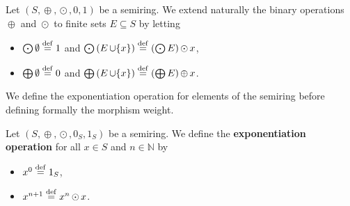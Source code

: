 \begin{notation} 
    \label{def:bigodot}
Let $(S, \mathop{\oplus}, \mathop{\odot}, 0, 1)$ be a semiring. We extend naturally the binary operations $\mathop{\oplus}$ and $\mathop{\odot}$ to finite sets $E \mathop{\subseteq} S$ by letting
    \begin{itemize}
        \item $\mathop{\bigodot} \emptyset \overset{\operatorname{def}}{=} 1$ and $\mathop{\bigodot} \left( E \mathop{\cup} \{x\} \right) \overset{\operatorname{def}}{=} \left( \mathop{\bigodot} E \right) \mathop{\odot} x$,
        \item $\mathop{\bigoplus} \emptyset \overset{\operatorname{def}}{=} 0$ and $\mathop{\bigoplus} \left( E \mathop{\cup} \{x\} \right) \overset{\operatorname{def}}{=} \left( \mathop{\bigoplus} E \right) \mathop{\oplus} x$.
    \end{itemize}
\end{notation}
 We define the exponentiation operation for elements of the semiring before defining formally the morphism weight.
\begin{notation} 
    \label{wfs:def:exponentiation}
Let $(S, \mathop{\oplus}, \mathop{\odot}, 0_S, 1_S)$ be a semiring. We define the \textbf{exponentiation operation} for all $x \mathop{\in} S$ and $n \mathop{\in} \mathbb{N}$ by
   \begin{itemize}
        \item $ x^0 \overset{\operatorname{def}}{=} 1_S$,
        \item $x^{n+1} \overset{\operatorname{def}}{=} x^n \mathop{\odot} x$.
   \end{itemize}
\end{notation}
